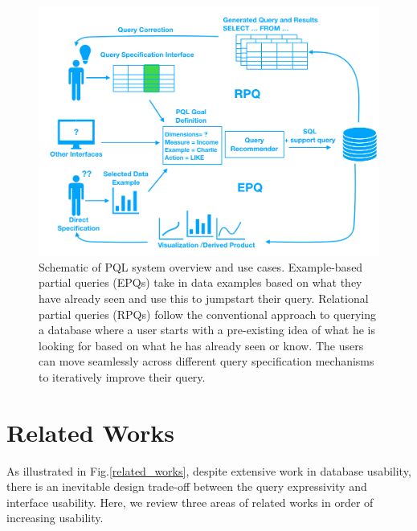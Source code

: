 \documentclass{sig-alternate-05-2015}
\begin{document}
\begin{figure}[ht!]\label{system}
\includegraphics[width=\linewidth]{figures/system.png}
\caption{Schematic of PQL system overview and use cases. Example-based partial queries (EPQs) take in data examples based on what they have already seen and use this to jumpstart their query. Relational partial queries (RPQs) follow the conventional approach to querying a database where a user starts with a pre-existing idea of what he is looking for based on what he has already seen or know.  The users can move seamlessly across different query specification mechanisms to iteratively improve their query.}
\end{figure}
\section{Related Works}
\par As illustrated in Fig.\ref{related_works}, despite extensive work in database usability, there is an inevitable design trade-off between the query expressivity and interface usability\cite{Jagadish2007,Morton2014}. Here, we review three areas of related works in order of increasing usability. 
\end{document}
